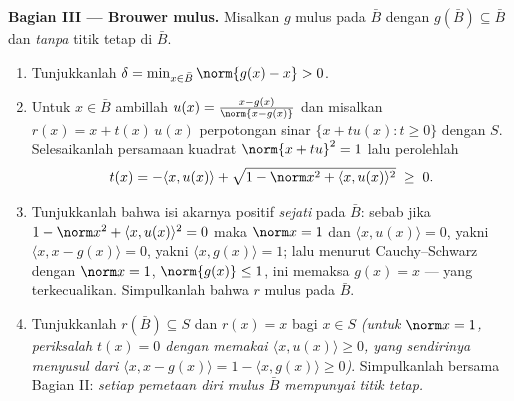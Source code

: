 \begin{problem}
\medskip
\noindent\textbf{Bagian III --- Brouwer mulus.} Misalkan $g$
mulus pada  $\bar B$ dengan $g(\bar B)
\subseteq \bar B$ dan \emph{tanpa} titik tetap di $\bar B$.
\begin{enumerate}[resume]
  \item Tunjukkanlah $\delta = \min_{x\in\bar B}\norm{g(x) - x} >
        0$.
  \item Untuk $x \in \bar B$ ambillah $u(x) = \frac{x -
        g(x)}{\norm{x - g(x)}}$ dan misalkan $r(x) = x +
        t(x)\,u(x)$ perpotongan sinar
        $\{x + tu(x) : t \geq 0\}$ dengan $S$. Selesaikanlah
        persamaan kuadrat $\norm{x + tu}^2 = 1$ lalu perolehlah
        \[
        t(x) = -\langle x, u(x)\rangle +
        \sqrt{1 - \norm x^2 + \langle x, u(x)\rangle^2}
        \;\geq\; 0 .
        \]
  \item Tunjukkanlah bahwa isi akarnya positif \emph{sejati}
        pada $\bar B$: sebab jika $1 - \norm x^2 + \langle x,
        u(x)\rangle^2 = 0$ maka $\norm x = 1$ dan $\langle
        x, u(x)\rangle = 0$, yakni $\langle x, x -
        g(x)\rangle = 0$, yakni $\langle x, g(x)\rangle =
        1$; lalu menurut Cauchy--Schwarz dengan $\norm x = 1$,
        $\norm{g(x)} \leq 1$, ini memaksa $g(x) = x$ ---
        yang terkecualikan. Simpulkanlah bahwa $r$ mulus pada
         $\bar B$.
  \item Tunjukkanlah $r(\bar B) \subseteq S$ dan $r(x) = x$ bagi $x
        \in S$ \emph{(untuk $\norm x = 1$, periksalah $t(x) = 0$
        dengan memakai $\langle x, u(x)\rangle \geq 0$, yang sendirinya
        menyusul dari $\langle x, x - g(x)\rangle = 1 -
        \langle x, g(x)\rangle \geq 0$)}. Simpulkanlah bersama
        Bagian II: \emph{setiap pemetaan diri mulus $\bar B$ mempunyai
        titik tetap.}
\end{enumerate}


\end{problem}
